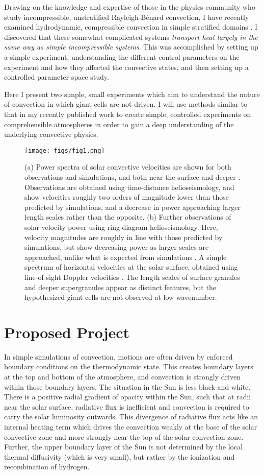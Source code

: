 \documentclass[aasms,12pt]{article}
\newcommand{\RB}{Rayleigh-B\'{e}nard }
\begin{document}
Drawing on the knowledge and expertise of those in the physics community who study incompressible,
unstratified \RB convection, I have recently examined hydrodynamic, compressible convection
in simple stratified domains \cite{anders&brown2017}.  I discovered that these somewhat complicated systems
\emph{transport heat largely in the same way as simple incompressible systems}.  
This was accomplished by setting up a simple experiment, understanding the different control parameters
on the experiment and how they affected the convective states, and then setting up a controlled parameter
space study.

Here I present two simple, small experiments which aim to understand the nature of convection
in which giant cells are not driven.  I will use methods similar to that in my recently published work
to create simple, controlled experiments on comprehensible atmospheres in order to gain a deep
understanding of the underlying convective physics.

\begin{figure}[t]
\centering
\texttt{[image: figs/fig1.png]}
\caption{(a) Power spectra of solar convective velocities are shown for both observations and simulations,
and both near the surface and deeper \cite{hanasoge&all2012}.  Observations are obtained
using time-distance helioseismology, and show velocities roughly two orders of magnitude lower
than those predicted by simulations, and a decrease in power approaching larger length
scales rather than the opposite. (b) Further observations of solar velocity power  using
ring-diagram helioseismology.  Here, velocity magnitudes are roughly in line with those
predicted by simulations, but show decreasing power as larger scales are approached, unlike
what is expected from simulations \cite{greer&all2015}.  A simple spectrum of horizontal
velocities at the solar surface, obtained using line-of-sight Doppler velocities \cite{hathaway&all2015}.
The length scales of surface granules and deeper supergranules appear as distinct features, but
the hypothesized giant cells are not observed at low wavenumber.
        \label{fig:fig1}}
\end{figure}

\section{Proposed Project}
In simple simulations of convection, motions are often driven by enforced boundary conditions
on the thermodynamic state.  This creates boundary layers at the top and bottom of the atmosphere,
and convection is strongly driven within those boundary layers.  The situation in the Sun is less
black-and-white.  There is a positive radial gradient of opacity within the Sun, such that at
radii near the solar surface, radiative flux is inefficient and convection is required to carry
the solar luminosity outwards.  This divergence of radiative flux acts like an internal heating term
which drives the convection weakly at the base of the solar convective zone and more strongly near the
top of the solar convection zone.  Further, the upper boundary layer of the Sun is not determined by the
local thermal diffusivity (which is very small), but rather by the ionization and recombination of hydrogen.
\end{document}
